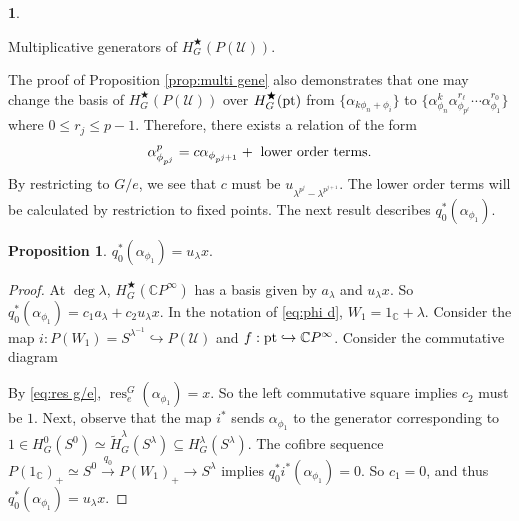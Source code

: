 \documentclass[a4paper,leqno,11pt]{amsart}
\theoremstyle{plain}
\theoremstyle{definition}
\newtheorem{prop}[theorem]{Proposition}
\newtheorem{subsec}[theorem]{}
\theoremstyle{remark}
\theoremstyle{definition}
\newcommand{\C}{{\mathbb C}}
\newenvironment{mysubsection}[2][]
{\begin{subsec}\begin{upshape}\begin{bfseries}{#2.}
			\end{bfseries}{#1}}
		{\end{upshape}\end{subsec}}
\newcommand{\res}{\mathit{res}}
\def\C{\mathbb{C}}
\numberwithin{equation}{section}
\def\tH{\tilde{H}}
\newcommand{\pt}{\textup{pt}}
\renewcommand{\res}{\operatorname{res}}
\begin{document}
\begin{mysubsection}{Multiplicative generators of $H^{\bigstar}_{G}(P(\mathcal{U}))$}
		The proof of Proposition \ref{prop:multi gene} also demonstrates that one may change the basis of $ H^\bigstar_G(P(\mathcal{U})) $ over $ H^\bigstar_G(\pt) $ from $ \{\alpha_{k\phi_n+\phi_i}\} $ to $ \{\alpha_{\phi_n}^k  \alpha_{\phi_{p^\ell}}^{r_\ell}\cdots \alpha_{\phi_1}^{r_0}\}$ where $ 0\le r_j\le p-1 $. Therefore, there exists a relation of the form 
		\[
		\alpha_{\phi_{p^j}}^p=c\alpha_{\phi_{p^{j+1}}}+\textup{~lower order terms}.
		\]
		By restricting to $ G/e $, we see that $ c $ must be $ u_{\lambda^{p^j}-\lambda^{p^{j+1}}} $. The lower order terms will be calculated by restriction to fixed points.
		The next result describes $ q_0^*(\alpha_{\phi_1}) $. 
		\begin{prop}\label{prop:q0 of alp lamb}
			$ q_0^*(\alpha_{\phi_1}) =u_\lambda x$.
		
		\end{prop}
		\begin{proof}
			At $ \deg  \lambda$, $ H^{\bigstar}_{G}(\mathbb{C}P^{\infty}) $ has a basis given by $ a_\lambda $ and $ u_\lambda x $.  So  $  q_0^*(\alpha_{\phi_1})= c_1 a_\lambda+c_2 u_\lambda x$. In the notation of \eqref{eq:phi d}, $ W_1= 1_{\C}+\lambda$. Consider the map $ i:P(W_1)=S^{\lambda^{-1}}\hookrightarrow  P(\mathcal{U})$ and $ f:\pt\hookrightarrow  \C P^\infty $. Consider the commutative diagram  
			\begin{center}
			\end{center}
			By \eqref{eq:res g/e},  $ \res^{G}_e(\alpha_{\phi_1})=x $. So the left commutative  square implies $ c_2 $ must be $ 1 $.   Next, observe that the map $ i^* $
			sends $\alpha_{\phi_1} $ to the generator corresponding to $ 1\in H^0_G(S^0)\simeq \tH^\lambda_G(S^\lambda)\subseteq H^\lambda_G(S^\lambda) $.
			The cofibre sequence   
			$ P(1_{\C})_+\simeq S^0 \xrightarrow{q_0} P(W_1)_+\to S^\lambda $ implies $ q_0^*i^*(\alpha_{\phi_1})=0 $. So $ c_1=0 $, and thus $ q_0^*(\alpha_{\phi_1}) =u_\lambda x$.
		\end{proof} 
	\end{mysubsection}
\end{document}
